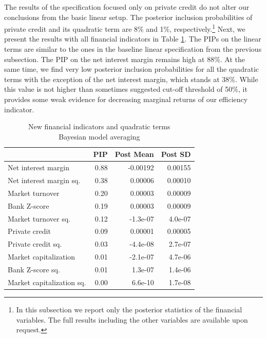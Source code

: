 \begin{refsection}
The results of the specification focused only on private credit do not alter our conclusions from the basic linear setup. The posterior inclusion probabilities of private credit and its quadratic term are 8\% and 1\%, respectively.\footnote{In this subsection we report only the posterior statistics of the financial variables. The full results including the other variables are available upon request.} Next, we present the results with all financial indicators in Table \ref{ch2fig:BMAquad}. The \acp{PIP} on the linear terms are similar to the ones in the baseline linear specification from the previous subsection. The \ac{PIP} on the net interest margin remains high at 88\%. At the same time, we find very low posterior inclusion probabilities for all the quadratic terms with the exception of the net interest margin, which stands at 38\%. While this value is not higher than sometimes suggested cut-off threshold of 50\%, it provides some weak evidence for decreasing marginal returns of our efficiency indicator. 

\begin{table}[!htbp]
	\centering
	\caption{New financial indicators and quadratic terms\\
		Bayesian model averaging}
		\label{ch2fig:BMAquad}
	\small
	\begin{tabular}{lrrr}
		\toprule
		& PIP & Post Mean & Post SD \\ 
		\midrule
		  Net interest margin & 0.88 & -0.00192 & 0.00155\\ 
		  Net interest margin sq. & 0.38 & 0.00006 & 0.00010\\ 
		  Market turnover & 0.20 & 0.00003 & 0.00009\\ 
		  Bank Z-score & 0.19 & 0.00003 & 0.00009\\ 
		  Market turnover sq. & 0.12 & -1.3e-07 & 4.0e-07 \\ 
		  Private credit & 0.09 & 0.00001 & 0.00005\\ 
		  Private credit sq. & 0.03 & -4.4e-08 & 2.7e-07 \\ 
		  Market capitalization & 0.01 & -2.1e-07 & 4.7e-06 \\ 
		  Bank Z-score sq. & 0.01 & 1.3e-07 & 1.4e-06 \\ 
		  Market capitalization sq. & 0.00 & 6.6e-10 & 1.7e-08 \\
		\bottomrule
	\end{tabular}
\end{table}


\end{refsection}
